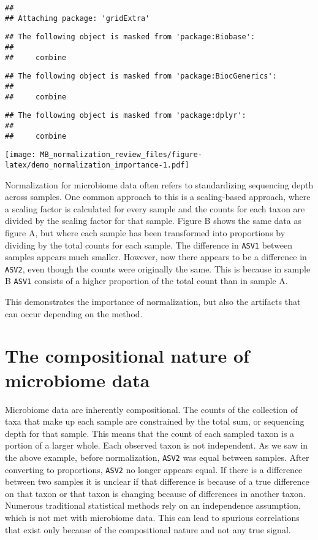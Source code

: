 \documentclass[
]{book}
\begin{document}
\begin{verbatim}
## 
## Attaching package: 'gridExtra'
\end{verbatim}

\begin{verbatim}
## The following object is masked from 'package:Biobase':
## 
##     combine
\end{verbatim}

\begin{verbatim}
## The following object is masked from 'package:BiocGenerics':
## 
##     combine
\end{verbatim}

\begin{verbatim}
## The following object is masked from 'package:dplyr':
## 
##     combine
\end{verbatim}

\texttt{[image: MB\_normalization\_review\_files/figure-latex/demo\_normalization\_importance-1.pdf]}

Normalization for microbiome data often refers to standardizing sequencing depth across samples. One common approach to this is a scaling-based approach, where a scaling factor is calculated for every sample and the counts for each taxon are divided by the scaling factor for that sample. Figure B shows the same data as figure A, but where each sample has been transformed into proportions by dividing by the total counts for each sample. The difference in \texttt{ASV1} between samples appears much smaller. However, now there appears to be a difference in \texttt{ASV2}, even though the counts were originally the same. This is because in sample B \texttt{ASV1} consists of a higher proportion of the total count than in sample A.

This demonstrates the importance of normalization, but also the artifacts that can occur depending on the method.

\hypertarget{the-compositional-nature-of-microbiome-data}{%
\section{The compositional nature of microbiome data}\label{the-compositional-nature-of-microbiome-data}}

Microbiome data are inherently compositional. The counts of the collection of taxa that make up each sample are constrained by the total sum, or sequencing depth for that sample. This means that the count of each sampled taxon is a portion of a larger whole. Each observed taxon is not independent. As we saw in the above example, before normalization, \texttt{ASV2} was equal between samples. After converting to proportions, \texttt{ASV2} no longer appears equal. If there is a difference between two samples it is unclear if that difference is because of a true difference on that taxon or that taxon is changing because of differences in another taxon.
Numerous traditional statistical methods rely on an independence assumption, which is not met with microbiome data. This can lead to spurious correlations that exist only because of the compositional nature and not any true signal.
\end{document}
